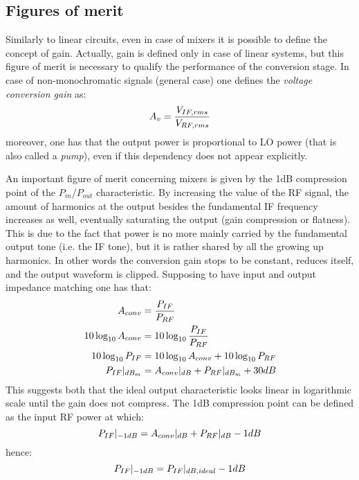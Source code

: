 \subsection{Figures of merit}
Similarly to linear circuits, even in case of mixers it is possible to define the concept of gain. Actually, gain is defined only in case of linear systems, but this figure of merit is necessary to qualify the performance of the conversion stage.
In case of non-monochromatic signals (general case) one defines the \emph{voltage conversion gain} as:
\begin{equation}
	A_v= \frac{V_{IF,rms}}{V_{RF,rms}} \notag
\end{equation}
moreover, one has that the output power is proportional to LO power (that is also called a \emph{pump}), even if this dependency does not appear explicitly.

An important figure of merit concerning mixers is given by the 1dB compression point of the $P_{in}$/$P_{out}$ characteristic. By increasing the value of the RF signal, the amount of harmonics at the output besides the fundamental IF frequency increases as well, eventually saturating the output (gain compression or flatness). This is due to the fact that power is no more mainly carried by the fundamental output tone (i.e. the IF tone), but it is rather shared by all the growing up harmonics. In other words the conversion gain stops to be constant, reduces itself, and the output waveform is clipped. Supposing to have input and output impedance matching one has that:
\begin{align}
	A_{conv}&=\frac{P_{IF}}{P_{RF}} \notag \\
	10\log_{10}A_{conv} & = 10\log_{10}\frac{P_{IF}}{P_{RF}}  \notag \\
	10\log_{10}P_{IF} & = 10\log_{10}A_{conv} + 10\log_{10}P_{RF} \notag \\	P_{IF}|_{dB_{m}} &= A_{conv}|_{dB} + P_{RF}|_{dB_{m}}+30dB \notag
\end{align}
This suggests both that the ideal output characteristic looks linear in logarithmic scale until the gain does not compress. The 1dB compression point can be defined as the input RF power at which:
\begin{equation}
P_{IF}|_{-1dB} = A_{conv}|_{dB} + P_{RF}|_{dB} -1dB \notag
\end{equation}
hence:
\begin{equation}
P_{IF}|_{-1dB} = P_{IF}|_{dB,ideal} -1dB \notag
\end{equation}

